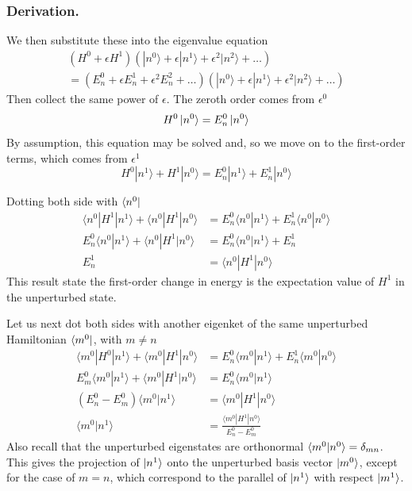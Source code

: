 \documentclass[../../../main.tex]{subfiles}
\begin{document}
\subsubsection{Derivation.}
We then substitute these into the eigenvalue equation
\begin{multline*}
    (H^0+\epsilon H^1) \left( |n^{0}\rangle +\epsilon |n^{1}\rangle +\epsilon^2 |n^{2}\rangle + \dots  \right) \\
    = \left( E_n^{0} + \epsilon E_n^{1} +\epsilon^2 E_n^{2} + \dots \right) \left( |n^{0}\rangle +\epsilon |n^{1}\rangle +\epsilon^2 |n^{2}\rangle + \dots  \right)
\end{multline*}
Then collect the same power of $\epsilon$.
The zeroth order comes from  $\epsilon^0$
\begin{equation*}
    H^0 \ket{n^0}=E_n^0 \ket{n ^0}
\end{equation*}
By assumption, this equation may be solved and, so we move on to the first-order terms, which comes from $\epsilon^1$
\begin{equation*}
    H^{0} | n^{1} \rangle + H^{1} | n^{0} \rangle = E^{0}_{n} | n^{1} \rangle + E^{1}_{n} | n^{0} \rangle
\end{equation*}

Dotting both side with $\bra{n^0}$
\begin{align*}
    \langle n^0 | H^1 | n^1 \rangle + \langle n^0 | H^1 | n^0 \rangle & =  E^0_n \langle n^0 | n^1 \rangle + E^1_n \langle n^0 | n^0 \rangle \\
    E^0_n \langle n^0 | n^1 \rangle + \langle n^0 | H^1 | n^0 \rangle & =  E^0_n \langle n^0 | n^1 \rangle + E^1_n                           \\
    E^1_n                                                             & =  \langle n^0 | H^1 | n^0 \rangle
\end{align*}
This result state the first-order change in energy is the expectation value of $H^1$ in the unperturbed state.

Let us next dot both sides with another eigenket of the same unperturbed Hamiltonian $\bra{m^0}$, with $m \neq n$
\begin{align*}
    \langle m^{0}|H^{0}|n^{1}\rangle + \langle m^{0}|H^{1}|n^{0}\rangle  & = E^{0}_n\langle m^{0}|n^{1}\rangle + E^{1}_n\langle m^{0}|n^{0}\rangle \\
    E^{0}_m\langle m^{0}|n^{1}\rangle + \langle m^{0}|H^{1}|n^{0}\rangle & =  E^{0}_n\langle m^{0}|n^{1}\rangle                                    \\
    (E^{0}_n - E^{0}_m) \langle m^{0} | n^{1} \rangle                    & =  \langle m^{0} | H^{1} | n^{0} \rangle                                \\
    \langle m^{0} | n^{1} \rangle                                        & =  \frac{\langle m^{0} | H^{1} | n^{0} \rangle}{E^{0}_n - E^{0}_m}
\end{align*}
Also recall that the unperturbed eigenstates are orthonormal $\braket{m^0  | n^0 }=\delta_{mn}$.
This gives the projection of  $\ket{n^1}$ onto the unperturbed basis vector $\ket{m^0}$, except for the case of $m=n$, which correspond to the parallel of $\ket{n ^{1 }}$ with respect $\ket{m ^{1}}$.
\end{document}
